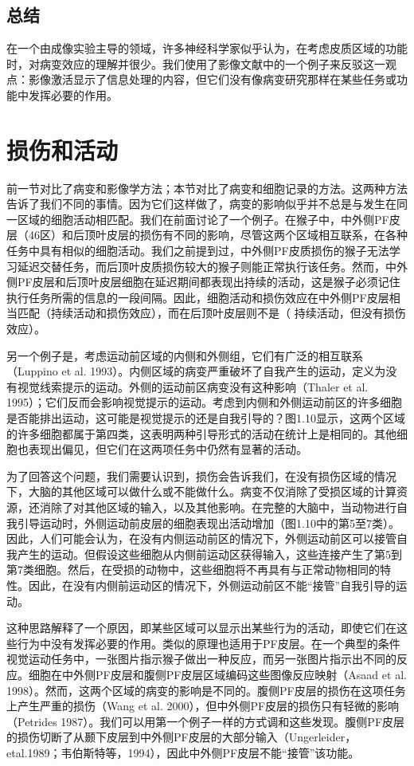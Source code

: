 \subsection{总结}
在一个由成像实验主导的领域，许多神经科学家似乎认为，在考虑皮质区域的功能时，对病变效应的理解并很少。我们使用了影像文献中的一个例子来反驳这一观点：影像激活显示了信息处理的内容，但它们没有像病变研究那样在某些任务或功能中发挥必要的作用。
\section{损伤和活动}
前一节对比了病变和影像学方法；本节对比了病变和细胞记录的方法。这两种方法告诉了我们不同的事情。因为它们这样做了，病变的影响似乎并不总是与发生在同一区域的细胞活动相匹配。我们在前面讨论了一个例子。在猴子中，中外侧PF皮层（46区）和后顶叶皮层的损伤有不同的影响，尽管这两个区域相互联系，在各种任务中具有相似的细胞活动。我们之前提到过，中外侧PF皮质损伤的猴子无法学习延迟交替任务，而后顶叶皮质损伤较大的猴子则能正常执行该任务。然而，中外侧PF皮层和后顶叶皮层细胞在延迟期间都表现出持续的活动，这是猴子必须记住执行任务所需的信息的一段间隔。因此，细胞活动和损伤效应在中外侧PF皮层相当匹配（持续活动和损伤效应），而在后顶叶皮层则不是（ 持续活动，但没有损伤效应）。
\par
另一个例子是，考虑运动前区域的内侧和外侧组，它们有广泛的相互联系（Luppino et al. 1993）。内侧区域的病变严重破坏了自我产生的运动，定义为没有视觉线索提示的运动。外侧的运动前区病变没有这种影响（Thaler et al. 1995）；它们反而会影响视觉提示的运动。考虑到内侧和外侧运动前区的许多细胞是否能排出运动，这可能是视觉提示的还是自我引导的？图1.10显示，这两个区域的许多细胞都属于第四类，这表明两种引导形式的活动在统计上是相同的。其他细胞也表现出偏见，但它们在这两项任务中仍然有显著的活动。
\par
为了回答这个问题，我们需要认识到，损伤会告诉我们，在没有损伤区域的情况下，大脑的其他区域可以做什么或不能做什么。病变不仅消除了受损区域的计算资源，还消除了对其他区域的输入，以及其他影响。在完整的大脑中，当动物进行自我引导运动时，外侧运动前皮层的细胞表现出活动增加（图1.10中的第5至7类）。因此，人们可能会认为，在没有内侧运动前区的情况下，外侧运动前区可以接管自我产生的运动。但假设这些细胞从内侧前运动区获得输入，这些连接产生了第5到第7类细胞。然后，在受损的动物中，这些细胞将不再具有与正常动物相同的特性。因此，在没有内侧前运动区的情况下，外侧运动前区不能“接管”自我引导的运动。
\par
这种思路解释了一个原因，即某些区域可以显示出某些行为的活动，即使它们在这些行为中没有发挥必要的作用。类似的原理也适用于PF皮层。在一个典型的条件视觉运动任务中，一张图片指示猴子做出一种反应，而另一张图片指示出不同的反应。细胞在中外侧PF皮层和腹侧PF皮层区域编码这些图像反应映射（Asaad et al. 1998）。然而，这两个区域的病变的影响是不同的。腹侧PF皮层的损伤在这项任务上产生严重的损伤（Wang et al. 2000），但中外侧PF皮层的损伤只有轻微的影响（Petrides 1987）。我们可以用第一个例子一样的方式调和这些发现。腹侧PF皮层的损伤切断了从颞下皮层到中外侧PF皮层的大部分输入（Ungerleider，etal.1989；韦伯斯特等，1994），因此中外侧PF皮层不能“接管”该功能。
